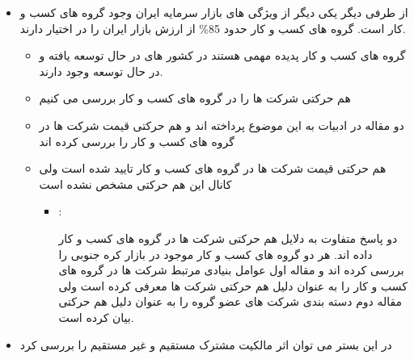 \documentclass[12pt, a4paper]{article}
\begin{document}
\begin{itemize}
\begin{itemize}
\item
نتایج به دست آمده در پژوهش های قبلی با استفاده از داده های مالکیت صندوق های سرمایه گذاری بدست آمده است
\item
در نتیجه نتایج بدست آمده محدود به این نوع مالکیت می باشد
\item
در صورتی که این نوع به خصوص مالکیت با توجه به نیاز ها و واسطه بودن، رفتار های به خصوصی انجام می دهند
\footnote{ 
	نشان داده است که جریان ورود و خروج مالی صندوق ها می تواند سبب ایجاد فشار قیمتی بر سهام شرکت ها شود و قیمت شرکت ها رو تحت تاثیر قرار دهد و این مسئله با موصوع مالکیت مشترک که می تواند سبب تغییر رفتار مدیران شرکت شود می تواند متفاوت باشد.}

\end{itemize}

\item 
از طرفی دیگر 
یکی دیگر از ویژگی های بازار سرمایه ایران وجود گروه های کسب و کار است. گروه های کسب و کار حدود 85\% از ارزش بازار ایران را در اختیار دارند.
\begin{itemize}
	\item
	گروه های کسب و کار پدیده مهمی هستند در کشور های در حال توسعه یافته و در حال توسعه وجود دارند.
	\item
	هم حرکتی شرکت ها را در گروه های کسب و کار بررسی می کنیم
	\item
	دو مقاله در ادبیات به این موضوع پرداخته اند و هم حرکتی قیمت شرکت ها در گروه های کسب و کار را بررسی کرده اند
	\item
	هم حرکتی قیمت شرکت ها در گروه های کسب و کار تایید شده است ولی کانال این هم حرکتی مشخص نشده است
	\begin{itemize}
		\item {}:
		\begin{itemize}
			دو پاسخ متفاوت به دلایل هم حرکتی شرکت ها در گروه های کسب و کار داده اند. هر دو گروه های کسب و کار موجود در بازار کره جنوبی را بررسی کرده اند و مقاله اول عوامل بنیادی مرتبط شرکت ها در گروه های کسب و کار را به عنوان دلیل هم حرکتی شرکت ها معرفی کرده است ولی مقاله دوم دسته بندی شرکت های عضو گروه را به عنوان دلیل هم حرکتی بیان کرده است. 
		\end{itemize}
		
	\end{itemize}

\end{itemize}
\item
در این بستر می توان اثر مالکیت مشترک مستقیم و غیر مستقیم را بررسی کرد
\end{itemize}
\end{document}
